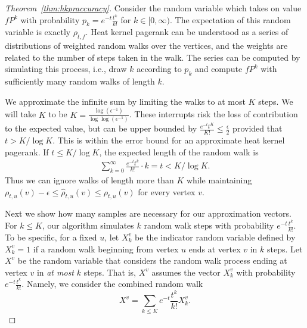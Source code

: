 \documentclass[runningheads,a4paper]{llncs}
\newcommand{\kparam}{\frac{\log(\epsilon^{-1})}{\log\log(\epsilon^{-1})}}
\begin{document}
\begin{proof}[Theorem~\ref{thm:hkpraccuracy}]
Consider the random variable which takes on value $fP^k$ with probability $p_k =
e^{-t}\frac{t^k}{k!}$ for $k\in [0, \infty)$.  The expectation of this random
variable is exactly $\rho_{t,f}$.  Heat kernel pagerank can be understood as a series
of distributions of weighted random walks over the vertices, and the weights are
related to the number of steps taken in the walk.  The series can be computed by
simulating this process, i.e., draw $k$ according to $p_k$ and compute $fP^k$
with sufficiently many random walks of length $k$.

We approximate the infinite sum by limiting the walks to at most $K$ steps.  We
will take $K$ to be $K= \kparam$.  These interrupts risk the loss of
contribution to the expected value, but can be upper bounded by
$\frac{e^{-t}t^K}{K!} \leq \frac{\epsilon}{2}$ provided that $t > K/\log K$.
This is within the error bound for an approximate heat kernel pagerank.  If $t
\leq K/ \log K$, the expected length of the random walk is
\begin{align*}
\sum_{k=0}^{\infty} \frac{e^{-t}t^k}{k!} \cdot k = t < K/\log K.
\end{align*}
Thus we can ignore walks of length more than $K$ while maintaining $\rho_{t,u}(v) -
\epsilon \leq \hat{\rho}_{t,u}(v) \leq \rho_{t,u}(v)$ for every vertex $v$.

Next we show how many samples are necessary for our approximation vectors.  For
$k\leq K$, our algorithm simulates $k$ random walk steps with probability
$e^{-t}\frac{t^k}{k!}$.  To be specific, for a fixed $u$, let $X^v_k$ be the
indicator random variable defined by $X^v_k = 1$ if a random walk beginning from
vertex $u$ ends at vertex $v$ in $k$ steps.  Let $X^v$ be the random variable
that considers the random walk process ending at vertex $v$ in \emph{at most}
$k$ steps.  That is, $X^v$ assumes the vector $X^v_k$ with probability
$e^{-t}\frac{t^k}{k!}$.  Namely, we consider the combined random walk
\begin{equation*}
X^v=\sum_{k \leq K} e^{-t}\frac{t^k}{k!} X^v_k.
\end{equation*}


\end{proof}
\end{document}
